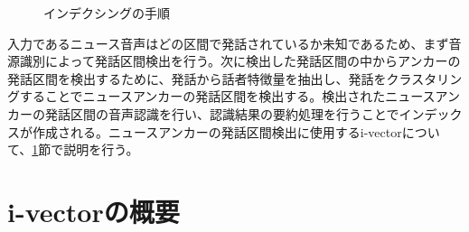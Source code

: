 \begin{figure}[H]
\begin{center}
  \end{center}
  \caption{インデクシングの手順 \label{fig:indexing}}
\end{figure}

入力であるニュース音声はどの区間で発話されているか未知であるため、まず音源識別によって発話区間検出を行う。次に検出した発話区間の中からアンカーの発話区間を検出するために、発話から話者特徴量を抽出し、発話をクラスタリングすることでニュースアンカーの発話区間を検出する。検出されたニュースアンカーの発話区間の音声認識を行い、認識結果の要約処理を行うことでインデックスが作成される。ニュースアンカーの発話区間検出に使用するi-vectorについて、\ref{chapter:iv}節で説明を行う。

%

\section{i-vectorの概要}
\label{chapter:iv}


%

